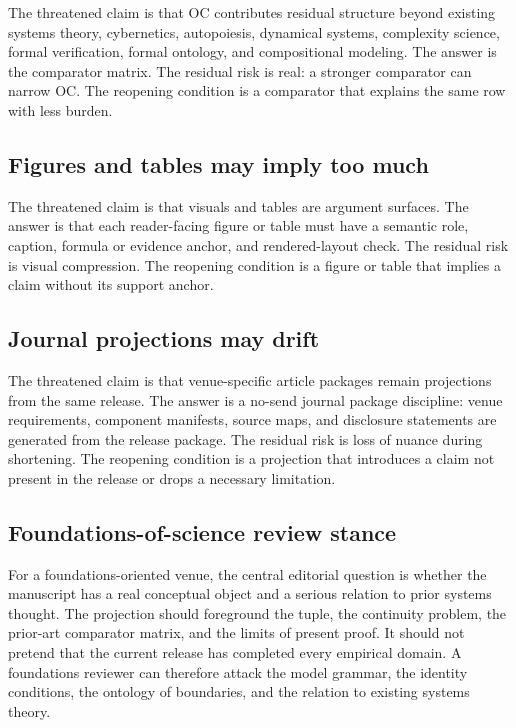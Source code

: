 The threatened claim is that OC contributes residual structure beyond existing
systems theory, cybernetics, autopoiesis, dynamical systems, complexity science,
formal verification, formal ontology, and compositional modeling. The answer is
the comparator matrix. The residual risk is real: a stronger comparator can
narrow OC. The reopening condition is a comparator that explains the same row
with less burden.

\subsection{Figures and tables may imply too much}

The threatened claim is that visuals and tables are argument surfaces. The
answer is that each reader-facing figure or table must have a semantic role,
caption, formula or evidence anchor, and rendered-layout check. The residual
risk is visual compression. The reopening condition is a figure or table that
implies a claim without its support anchor.

\subsection{Journal projections may drift}

The threatened claim is that venue-specific article packages remain projections
from the same release. The answer is a no-send journal package discipline:
venue requirements, component manifests, source maps, and disclosure statements
are generated from the release package. The residual risk is loss of nuance
during shortening. The reopening condition is a projection that introduces a
claim not present in the release or drops a necessary limitation.

\subsection{Foundations-of-science review stance}

For a foundations-oriented venue, the central editorial question is whether the
manuscript has a real conceptual object and a serious relation to prior systems
thought. The projection should foreground the tuple, the continuity problem,
the prior-art comparator matrix, and the limits of present proof. It should not
pretend that the current release has completed every empirical domain. A
foundations reviewer can therefore attack the model grammar, the identity
conditions, the ontology of boundaries, and the relation to existing systems
theory.

